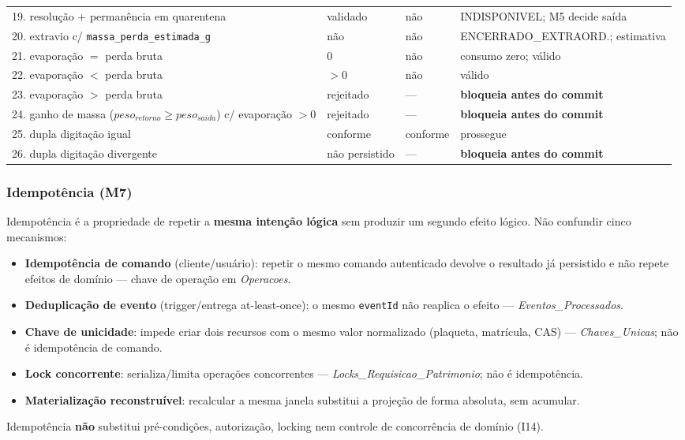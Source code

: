 \begin{longtable}{p{}p{}p{}p{}}
19. resolução + permanência em quarentena & validado & não & INDISPONIVEL; M5 decide saída \\
20. extravio c/ \texttt{massa\_perda\_estimada\_g} & não & não & ENCERRADO\_EXTRAORD.; estimativa \\
21. evaporação $=$ perda bruta & 0 & não & consumo zero; válido \\
22. evaporação $<$ perda bruta & $>0$ & não & válido \\
23. evaporação $>$ perda bruta & rejeitado & --- & \textbf{bloqueia antes do commit} \\
24. ganho de massa ($peso_{retorno}\ge peso_{saida}$) c/ evaporação $>0$ & rejeitado & --- & \textbf{bloqueia antes do commit} \\
25. dupla digitação igual & conforme & conforme & prossegue \\
26. dupla digitação divergente & não persistido & --- & \textbf{bloqueia antes do commit} \\
\end{longtable}

\subsubsection{Idempotência (M7)}
\label{sec:idempotencia-m7}
\begin{regra}
Idempotência é a propriedade de repetir a \textbf{mesma intenção lógica} sem produzir um segundo efeito lógico. Não confundir cinco mecanismos:
\begin{itemize}
    \item \textbf{Idempotência de comando} (cliente/usuário): repetir o mesmo comando autenticado devolve o resultado já persistido e não repete efeitos de domínio — chave de operação em \textit{Operacoes}.
    \item \textbf{Deduplicação de evento} (trigger/entrega at-least-once): o mesmo \texttt{eventId} não reaplica o efeito — \textit{Eventos\_Processados}.
    \item \textbf{Chave de unicidade}: impede criar dois recursos com o mesmo valor normalizado (plaqueta, matrícula, CAS) — \textit{Chaves\_Unicas}; não é idempotência de comando.
    \item \textbf{Lock concorrente}: serializa/limita operações concorrentes — \textit{Locks\_Requisicao\_Patrimonio}; não é idempotência.
    \item \textbf{Materialização reconstruível}: recalcular a mesma janela substitui a projeção de forma absoluta, sem acumular.
\end{itemize}
Idempotência \textbf{não} substitui pré-condições, autorização, locking nem controle de concorrência de domínio (I14).
\end{regra}

